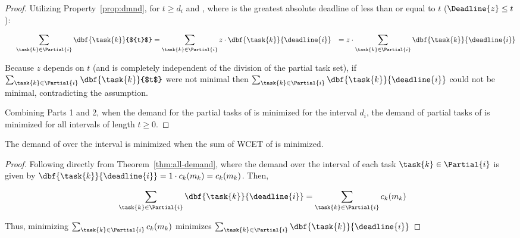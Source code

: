 \begin{theorem}
\begin{proof}
  Utilizing Property~\ref{prop:dmnd}, for ${t \ge d_i}$ and
  , where  is the greatest absolute deadline
  of  less than or equal to ${t}$ (${\Deadline{z} \le t}$): 

  \begin{equation*}
    \indent
    \begin{split}
    \sum_{\task{k} \in \Partial{i}} \dbf{\task{k}}{${t}$} &=
      \sum_{\task{k} \in \Partial{i}} z \cdot
      \dbf{\task{k}}{\deadline{i}} 
      & = z \cdot \sum_{\task{k} \in \Partial{i}} \dbf{\task{k}}{\deadline{i}}
    \end{split}
  \end{equation*}

  Because ${z}$ depends on ${t}$ (and is completely independent of the
  division of the partial task set), if ${\sum_{\task{k} \in \Partial{i}}
    \dbf{\task{k}}{$t$}}$ were not minimal then
  ${\sum_{\task{k} \in \Partial{i}} \dbf{\task{k}}{\deadline{i}}}$ could not
  be minimal, contradicting the assumption.

  Combining Parts 1 and 2, when the demand for the partial tasks of
   is minimized for the interval ${d_i}$, the demand of
  partial tasks of  is minimized for all intervals of 
  length ${t \ge 0}$.  
  
\end{proof}
\end{theorem}

\begin{corollary}
  \label{corollary:min-demand-di}
  The demand of  over the interval  is
  minimized when the sum of WCET of  is minimized.
\begin{proof} Following directly from
  Theorem~\ref{thm:all-demand}, where the demand over the interval
   of each task ${\task{k} \in \Partial{i}}$ is given by
  ${\dbf{\task{k}}{\deadline{i}} = 1 \cdot c_k(m_k) =
    c_k(m_k)}$. Then,

  \begin{equation*}
    \indent
    \begin{split}
      \sum_{\task{k} \in \Partial{i}} \dbf{\task{k}}{\deadline{i}} &=
        \sum_{\task{k} \in \Partial{i}} c_k(m_k)
    \end{split}
  \end{equation*}

  Thus, minimizing ${\sum_{\task{k} \in \Partial{i}} c_k(m_k)}$
  minimizes ${\sum_{\task{k} \in \Partial{i}}
  \dbf{\task{k}}{\deadline{i}}}$
\end{proof}

\end{corollary}

